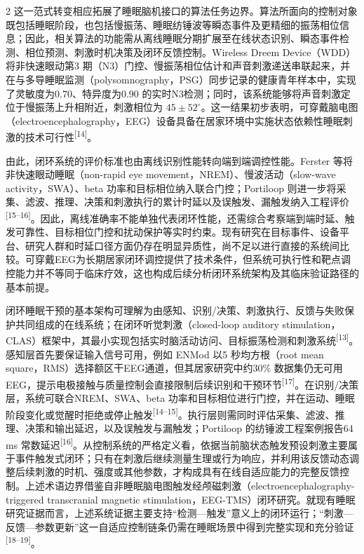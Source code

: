\documentclass[UTF8,zihao=5,fontset=none]{ctexart}
\newcommand{\hei}{\CJKfamily{hei}}
\newcommand{\leveltwo}[1]{%
  \par\vspace{6pt}\noindent{\hei\fontsize{10pt}{16pt}\selectfont\bfseries #1\par}\vspace{2pt}}
\newcommand{\refcite}[1]{\nolinebreak[4]\textsuperscript{[#1]}}
\begin{document}
\begin{multicols}{2}
这一范式转变相应拓展了睡眠脑机接口的算法任务边界。算法所面向的控制对象既包括睡眠阶段，也包括慢振荡、睡眠纺锤波等瞬态事件及更精细的振荡相位信息；因此，相关算法的功能需从离线睡眠分期扩展至在线状态识别、瞬态事件检测、相位预测、刺激时机决策及闭环反馈控制。Wireless Dreem Device（WDD）将非快速眼动第3 期（N3）门控、慢振荡相位估计和声音刺激递送串联起来，并在与多导睡眠监测（polysomnography，PSG）同步记录的健康青年样本中，实现了灵敏度为0.70、特异度为0.90 的实时N3检测；同时，该系统能够将声音刺激定位于慢振荡上升相附近，刺激相位为 $45\pm52^{\circ}$。这一结果初步表明，可穿戴脑电图（electroencephalography，EEG）设备具备在居家环境中实施状态依赖性睡眠刺激的技术可行性\refcite{14}。

由此，闭环系统的评价标准也由离线识别性能转向端到端调控性能。Ferster 等将非快速眼动睡眠（non-rapid eye movement，NREM）、慢波活动（slow-wave activity，SWA）、beta 功率和目标相位纳入联合门控；Portiloop 则进一步将采集、滤波、推理、决策和刺激执行的累计时延以及误触发、漏触发纳入工程评价\refcite{15--16}。因此，离线准确率不能单独代表闭环性能，还需综合考察端到端时延、触发可靠性、目标相位门控和扰动保护等实时约束。现有研究在目标事件、设备平台、研究人群和时延口径方面仍存在明显异质性，尚不足以进行直接的系统间比较。可穿戴EEG为长期居家闭环调控提供了技术条件，但系统可执行性和靶点调控能力并不等同于临床疗效，这也构成后续分析闭环系统架构及其临床验证路径的基本前提。

\leveltwo{1.3 闭环睡眠干预系统的基本架构}

闭环睡眠干预的基本架构可理解为由感知、识别/决策、刺激执行、反馈与失败保护共同组成的在线系统；在闭环听觉刺激（closed-loop auditory stimulation，CLAS）框架中，其最小实现包括实时脑活动访问、目标振荡检测和刺激系统\refcite{13}。感知层首先要保证输入信号可用，例如 ENMod 以5 秒均方根（root mean square，RMS）选择额区干EEG通道，但其居家研究中约30\% 数据集仍无可用EEG，提示电极接触与质量控制会直接限制后续识别和干预环节\refcite{17}。在识别/决策层，系统可联合NREM、SWA、beta 功率和目标相位进行门控，并在运动、睡眠阶段变化或觉醒时拒绝或停止触发\refcite{14--15}。执行层则需同时评估采集、滤波、推理、决策和输出延迟，以及误触发与漏触发；Portiloop 的纺锤波工程案例报告64 ms 常数延迟\refcite{16}。从控制系统的严格定义看，依据当前脑状态触发预设刺激主要属于事件触发式闭环；只有在刺激后继续测量生理或行为响应，并利用该反馈动态调整后续刺激的时机、强度或其他参数，才构成具有在线自适应能力的完整反馈控制。上述术语边界借鉴自非睡眠脑电图触发经颅磁刺激（electroencephalography-triggered transcranial magnetic stimulation，EEG-TMS）闭环研究。就现有睡眠研究证据而言，上述系统证据主要支持“检测—触发”意义上的闭环运行；“刺激—反馈—参数更新”这一自适应控制链条仍需在睡眠场景中得到完整实现和充分验证\refcite{18--19}。


\end{multicols}
\end{document}

